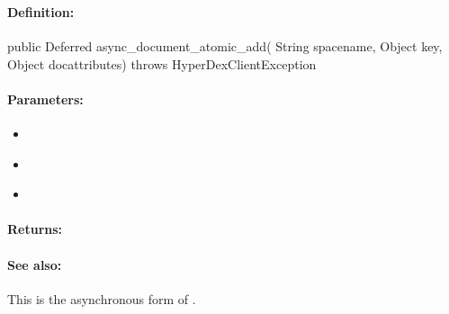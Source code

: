 \pagebreak
\subsubsection{}
\label{api:java:async_document_atomic_add}


\paragraph{Definition:}
\begin{javacode}
public Deferred async_document_atomic_add(
        String spacename,
        Object key,
        Object docattributes) throws HyperDexClientException
\end{javacode}

\paragraph{Parameters:}
\begin{itemize}[noitemsep]
\item {}\\

\item {}\\

\item {}\\

\end{itemize}

\paragraph{Returns:}


\paragraph{See also:}  This is the asynchronous form of .

\pagebreak
\subsubsection{}
\label{api:java:document_string_prepend}


